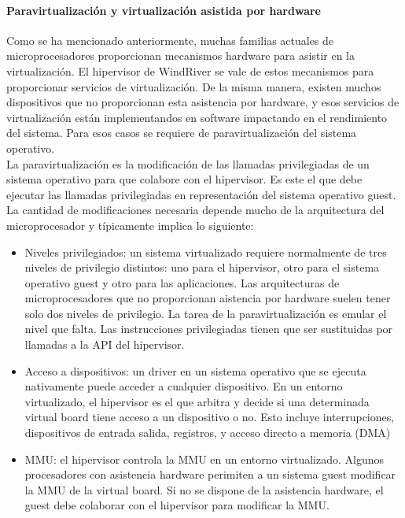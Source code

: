 \paragraph{Paravirtualización y virtualización asistida por hardware}
Como se ha mencionado anteriormente, muchas familias actuales de microprocesadores proporcionan mecanismos hardware para asistir en la virtualización. El hipervisor de WindRiver se vale de estos mecanismos para proporcionar servicios de virtualización. De la misma manera, existen muchos dispositivos que no proporcionan esta asistencia por hardware, y esos servicios de virtualización están implementandos en software impactando en el rendimiento del sistema. Para esos casos se requiere de paravirtualización del sistema operativo.\\
La paravirtualización es la modificación de las llamadas privilegiadas de un sistema operativo para que colabore con el hipervisor. Es este el que debe ejecutar las llamadas privilegiadas en representación del sistema operativo guest. La cantidad de modificaciones necesaria depende mucho de la arquitectura del microprocesador y típicamente implica lo siguiente:

\begin{itemize}
  \item Niveles privilegiados: un sistema virtualizado requiere normalmente de tres niveles de privilegio distintos: uno para el hipervisor, otro para el sistema operativo guest y otro para las aplicaciones. Las arquitecturas de microprocesadores que no proporcionan aistencia por hardware suelen tener solo dos niveles de privilegio. La tarea de la paravirtualización es emular el nivel que falta. Las instrucciones privilegiadas tienen que ser sustituidas por llamadas a la API del hipervisor.
  \item Acceso a dispositivos: un driver en un sistema operativo que se ejecuta nativamente puede acceder a cualquier dispositivo. En un entorno virtualizado, el hipervisor es el que arbitra y decide si una determinada virtual board tiene acceso a un dispositivo o no. Esto incluye interrupciones, dispositivos de entrada salida, registros, y acceso directo a memoria (DMA)
  \item \acrshort{MMU}: el hipervisor controla la \acrshort{MMU} en un entorno virtualizado. Algunos procesadores con asistencia hardware perimiten a un sistema guest modificar la \acrshort{MMU} de la virtual board. Si no se dispone de la asistencia hardware, el guest debe colaborar con el hipervisor para modificar la \acrshort{MMU}.
\end{itemize}


